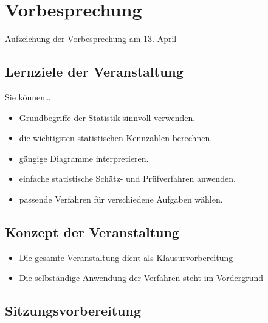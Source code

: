 \documentclass[
  11pt,
  ngerman,
  a4paper,
]{report}
\providecommand{\tightlist}{%
  \setlength{\itemsep}{0pt}\setlength{\parskip}{0pt}}
\begin{document}
\hypertarget{vorbesprechung}{%
\chapter*{Vorbesprechung}\label{vorbesprechung}}

\href{https://video01.uni-frankfurt.de/Mediasite/Play/c5c5115e37f948d0bfeb9610d18427661d}{Aufzeichung der Vorbesprechung am 13. April}

\hypertarget{lernziele-der-veranstaltung}{%
\section*{Lernziele der Veranstaltung}\label{lernziele-der-veranstaltung}}

Sie können\ldots{}

\begin{itemize}
\tightlist
\item
  Grundbegriffe der Statistik sinnvoll verwenden.
\item
  die wichtigsten statistischen Kennzahlen berechnen.
\item
  gängige Diagramme interpretieren.
\item
  einfache statistische Schätz- und Prüfverfahren anwenden.
\item
  passende Verfahren für verschiedene Aufgaben wählen.
\end{itemize}

\hypertarget{konzept-der-veranstaltung}{%
\section*{Konzept der Veranstaltung}\label{konzept-der-veranstaltung}}

\begin{itemize}
\tightlist
\item
  Die gesamte Veranstaltung dient als Klausurvorbereitung
\item
  Die selbständige Anwendung der Verfahren steht im Vordergrund
\end{itemize}

\hypertarget{sitzungsvorbereitung}{%
\section*{Sitzungsvorbereitung}\label{sitzungsvorbereitung}}
\end{document}
